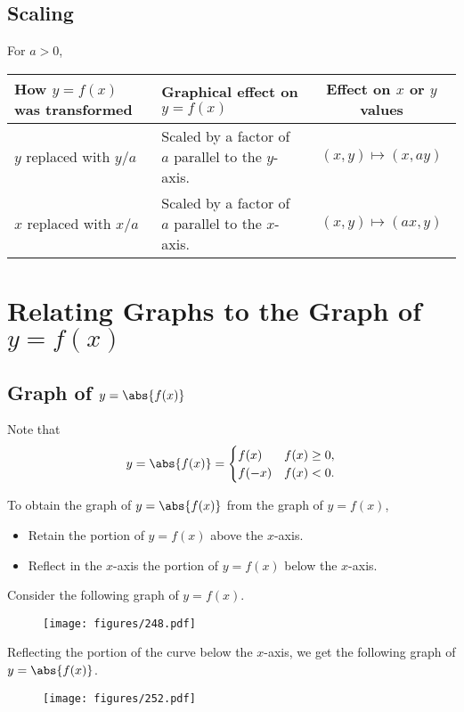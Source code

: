 \subsection{Scaling}

For $a > 0$,

\begin{table}[H]
    \centering
    \begin{tabularx}{\columnwidth}{|>{\centering\arraybackslash}X|>{\centering\arraybackslash}X|c|}
    \hline
    \textbf{How $y = f(x)$ was transformed} & \textbf{Graphical effect on $y = f(x)$} & \textbf{Effect on $x$ or $y$ values} \\ \hline\hline
    $y$ replaced with $y/a$ & Scaled by a factor of $a$ parallel to the $y$-axis. & $(x, y) \mapsto (x, ay)$ \\ \hline
    $x$ replaced with $x/a$ & Scaled by a factor of $a$ parallel to the $x$-axis. & $(x, y) \mapsto (ax, y)$ \\ \hline
    \end{tabularx}
\end{table}

\section{Relating Graphs to the Graph of $y = f(x)$}

\subsection{Graph of $y = \abs{f(x)}$}

Note that \[y = \abs{f(x)} = \begin{cases}
    f(x) & f(x) \geq 0,\\
    f(-x) & f(x) < 0.
\end{cases}\]

\begin{recipe}[Graph of $y = \abs{f(x)}$]
    To obtain the graph of $y = \abs{f(x)}$ from the graph of $y = f(x)$,
    \begin{itemize}
        \item Retain the portion of $y = f(x)$ above the $x$-axis.
        \item Reflect in the $x$-axis the portion of $y = f(x)$ below the $x$-axis.
    \end{itemize}
\end{recipe}

\begin{example}[Graph of $y = \abs{f(x)}$]
    Consider the following graph of $y = f(x)$.
    \begin{figure}[H]
        \centering
        \hspace{7em}\texttt{[image: figures/248.pdf]}
        \caption{\label{fig:248}}
    \end{figure}
    Reflecting the portion of the curve below the $x$-axis, we get the following graph of $y = \abs{f(x)}$.
    \begin{figure}[H]
        \centering
        \hspace{7em}\texttt{[image: figures/252.pdf]}
        \caption{}
    \end{figure}
\end{example}

